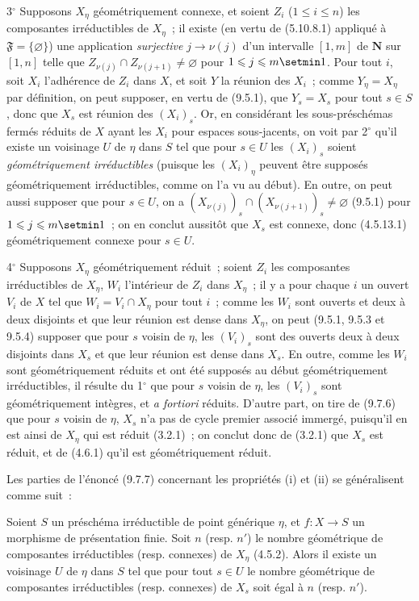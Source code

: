 3$^\circ$ Supposons $X_\eta$ géométriquement connexe, et soient $Z_i$
($1\leqslant i\leqslant n$) les composantes irréductibles de $X_\eta$~; il
existe (en vertu de (5.10.8.1) appliqué à $\mathfrak F=\{\varnothing\}$) une
application \emph{surjective} $j\to\nu(j)$ d'un intervalle $[1,m]$ de
$\mathbf N$ sur $[1,n]$ telle que
$Z_{\nu(j)}\cap Z_{\nu(j+1)}\neq\varnothing$ pour $1\leqslant j\leqslant m\setmin 1$.
Pour tout $i$, soit $X_i$ l'adhérence de $Z_i$ dans $X$, et soit $Y$ la réunion
des $X_i$~; comme $Y_\eta=X_\eta$ par définition, on peut supposer, en vertu de
(9.5.1), que $Y_s=X_s$ pour tout $s\in S$, donc que $X_s$ est réunion des
$(X_i)_s$. Or, en considérant les sous-préschémas fermés réduits de $X$ ayant
les $X_i$ pour espaces sous-jacents, on voit par 2$^\circ$ qu'il existe un
voisinage $U$ de $\eta$ dans $S$ tel que pour $s\in U$ les $(X_i)_s$ soient
\emph{géométriquement irréductibles} (puisque les $(X_i)_\eta$ peuvent être
supposés géométriquement irréductibles, comme on l'a vu au début). En outre, on
peut aussi supposer que pour $s\in U$, on a
$(X_{\nu(j)})_s\cap(X_{\nu(j+1)})_s\neq\varnothing$ (9.5.1) pour
$1\leqslant j\leqslant m\setmin 1$~; on en conclut aussitôt que $X_s$ est connexe, donc
(4.5.13.1) géométriquement connexe pour $s\in U$.

4$^\circ$ Supposons $X_\eta$ géométriquement réduit~; soient $Z_i$ les
composantes irréductibles de $X_\eta$, $W_i$ l'intérieur de $Z_i$ dans
$X_\eta$~; il y a pour chaque $i$ un ouvert $V_i$ de $X$ tel que
$W_i=V_i\cap X_\eta$ pour tout $i$~; comme les $W_i$ sont ouverts et deux à deux
disjoints et que leur réunion est dense dans $X_\eta$, on peut (9.5.1, 9.5.3 et
9.5.4) supposer que pour $s$ voisin de $\eta$, les $(V_i)_s$ sont des ouverts
deux à deux disjoints dans $X_s$ et que leur réunion est dense dans $X_s$. En
outre, comme les $W_i$ sont géométriquement réduits et ont été supposés au
début géométriquement irréductibles, il résulte du 1$^\circ$ que pour $s$ voisin
de $\eta$, les $(V_i)_s$ sont géométriquement intègres, et \emph{a fortiori}
réduits. D'autre part, on tire de (9.7.6) que pour $s$ voisin de $\eta$, $X_s$
n'a pas de cycle premier associé immergé, puisqu'il en est ainsi de $X_\eta$
qui est réduit (3.2.1)~; on conclut donc de (3.2.1) que $X_s$ est réduit, et de
(4.6.1) qu'il est géométriquement réduit.


Les parties de l'énoncé (9.7.7) concernant les propriétés (i) et (ii) se
généralisent comme suit~:

\begin{proposition}[9.7.8]
\label{IV.9.7.8-fr}
Soient $S$ un préschéma irréductible de point générique $\eta$, et $f:X\to S$
un morphisme de présentation finie. Soit $n$ \textup{(resp. $n'$)} le nombre géométrique
de composantes irréductibles \textup{(resp.} connexes\textup{)} de $X_\eta$ \textup{(4.5.2)}. Alors il
existe un voisinage $U$ de $\eta$ dans $S$ tel que pour tout $s\in U$ le nombre
géométrique de composantes irréductibles \textup{(resp.} connexes\textup{)} de $X_s$ soit égal à
$n$ \textup{(resp. $n'$)}.
\end{proposition}

